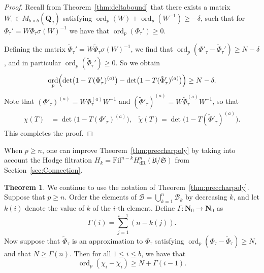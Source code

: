 \documentclass[a4paper,11pt]{article}
\numberwithin{equation}{section}
\newcommand{\NN}{\mathbf{N}} %
\newcommand{\QQ}{\mathbf{Q}} %
\DeclareMathOperator{\ord}{ord}          %
\providecommand{\HdR}{H_{\text{dR}}}    %
\providecommand{\cB}{\mathcal{B}} %
\theoremstyle{definition}
\newtheorem{thm}{Theorem}[section]
\newtheorem{rem}[thm]{Remark}
\begin{document}
\begin{proof} 
Recall from Theorem~\ref{thm:deltabound} that there exists a matrix 
$W_{\tau} \in M_{b \times b}(\QQ_q)$ satisfying 
$\ord_p(W)+\ord_p(W^{-1}) \geq -\delta$, such that for 
$\Phi_{\tau}'=W \Phi_{\tau} \sigma(W)^{-1}$ we have that 
\mbox{$\ord_p(\Phi_{\tau}') \geq 0$}.

Defining the matrix 
$\tilde{\Phi}_{\tau}'=W \tilde{\Phi}_{\tau} \sigma(W)^{-1}$, we find that 
$\ord_p(\Phi'_{\tau}-\tilde{\Phi}_{\tau}') \geq N-\delta$, and in particular
$\ord_p(\tilde{\Phi}_{\tau}') \geq 0$. So we obtain
\[
\ord_p \Bigl( \det\bigl(1 - T (\Phi'_{\tau})^{(a)}\bigr) 
            - \det\bigl(1 - T (\tilde{\Phi}'_{\tau})^{(a)}\bigr) \Bigr) \geq N-\delta.
\] 
Note that $(\Phi'_{\tau})^{(a)}= W \Phi_{\tau}^{(a)} W^{-1}$
and $(\tilde{\Phi}'_{\tau})^{(a)}= W \tilde{\Phi}_{\tau}^{(a)} W^{-1}$, so that
\begin{align*}
\chi(T) &= \det\bigl(1 - T (\Phi'_{\tau})^{(a)}\bigr), \;\;\; 
\tilde{\chi}(T) = \det\bigl(1 - T (\tilde{\Phi}'_{\tau})^{(a)}\bigr).
\end{align*}
This completes the proof.
\end{proof}


When $p \geq n$, one can improve Theorem~\ref{thm:preccharpoly} by taking into 
account the Hodge filtration $H_k=\mbox{Fil}^{n-k} \HdR^{n}(\mathfrak{U}/\mathfrak{S})$ 
from Section~\ref{sec:Connection}.

\begin{thm} \label{thm:pgeqn}
We continue to use the notation of Theorem~\ref{thm:preccharpoly}. Suppose 
that $p \geq n$. Order the elements of $\cB = \bigcup_{k=1}^n \cB_k$ by 
decreasing $k$, and let $k(i)$ denote the value of $k$ of the $i$-th element. 
Define $\Gamma: \NN _0\rightarrow \NN_0$ as
\[
\Gamma(i) = \sum_{j=1}^{i-1} (n-k(j)).
\]
Now suppose that $\tilde{\Phi}_{\tau}$ is an approximation to $\Phi_{\tau}$ 
satisfying $\ord_p (\Phi_{\tau}-\tilde{\Phi}_{\tau}) \geq N$, and that 
$N \geq \Gamma(n)$. Then for all $1 \leq i \leq b$, we have that 
\[
\ord_p(\chi_i-\tilde{\chi}_i) \geq N + \Gamma(i-1).
\]
\end{thm}
 
\end{document}
